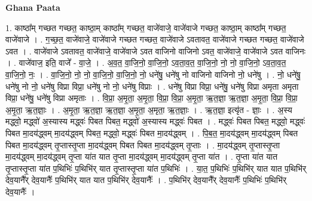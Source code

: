 \documentclass[17pt]{extarticle}
\begin{document}
\textbf{Ghana Paata } \newline

1. काष्ठा᳚म् गच्छत गच्छत॒ काष्ठा॒म् काष्ठा᳚म् गच्छत॒ वाजे॑वाजे॒ वाजे॑वाजे गच्छत॒ काष्ठा॒म् काष्ठा᳚म् गच्छत॒ वाजे॑वाजे । . ग॒च्छ॒त॒ वाजे॑वाजे॒ वाजे॑वाजे गच्छत गच्छत॒ वाजे॑वाजे ऽवतावत॒ वाजे॑वाजे गच्छत गच्छत॒ वाजे॑वाजे ऽवत । . वाजे॑वाजे ऽवतावत॒ वाजे॑वाजे॒ वाजे॑वाजे ऽवत वाजिनो वाजिनो ऽवत॒ वाजे॑वाजे॒ वाजे॑वाजे ऽवत वाजिनः । . वाजे॑वाज॒ इति॒ वाजे᳚ - वा॒जे॒ । . अ॒व॒त॒ वा॒जि॒नो॒ वा॒जि॒नो॒ ऽव॒ता॒व॒त॒ वा॒जि॒नो॒ नो॒ नो॒ वा॒जि॒नो॒ ऽव॒ता॒व॒त॒ वा॒जि॒नो॒ नः॒ । . वा॒जि॒नो॒ नो॒ नो॒ वा॒जि॒नो॒ वा॒जि॒नो॒ नो॒ धने॑षु॒ धने॑षु नो वाजिनो वाजिनो नो॒ धने॑षु । . नो॒ धने॑षु॒ धने॑षु नो नो॒ धने॑षु विप्रा विप्रा॒ धने॑षु नो नो॒ धने॑षु विप्राः । . धने॑षु विप्रा विप्रा॒ धने॑षु॒ धने॑षु विप्रा अमृता अमृता विप्रा॒ धने॑षु॒ धने॑षु विप्रा अमृताः । . वि॒प्रा॒ अ॒मृ॒ता॒ अ॒मृ॒ता॒ वि॒प्रा॒ वि॒प्रा॒ अ॒मृ॒ता॒ ऋ॒त॒ज्ञा॒ ऋ॒त॒ज्ञा॒ अ॒मृ॒ता॒ वि॒प्रा॒ वि॒प्रा॒ अ॒मृ॒ता॒ ऋ॒त॒ज्ञाः॒ । . अ॒मृ॒ता॒ ऋ॒त॒ज्ञा॒ ऋ॒त॒ज्ञा॒ अ॒मृ॒ता॒ अ॒मृता॒ ऋ॒त॒ज्ञाः॒ । . ऋ॒त॒ज्ञा॒ इत्यृ॑त - ज्ञाः॒ । . अ॒स्य मद्ध्वो॒ मद्ध्वो॑ अ॒स्यास्य मद्ध्वः॑ पिबत पिबत॒ मद्ध्वो॑ अ॒स्यास्य मद्ध्वः॑ पिबत । . मद्ध्वः॑ पिबत पिबत॒ मद्ध्वो॒ मद्ध्वः॑ पिबत मा॒दय॑द्ध्वम् मा॒दय॑द्ध्वम् पिबत॒ मद्ध्वो॒ मद्ध्वः॑ पिबत मा॒दय॑द्ध्वम् । . पि॒ब॒त॒ मा॒दय॑द्ध्वम् मा॒दय॑द्ध्वम् पिबत पिबत मा॒दय॑द्ध्वम् तृ॒प्तास्तृ॒प्ता मा॒दय॑द्ध्वम् पिबत पिबत मा॒दय॑द्ध्वम् तृ॒प्ताः । . मा॒दय॑द्ध्वम् तृ॒प्तास्तृ॒प्ता मा॒दय॑द्ध्वम् मा॒दय॑द्ध्वम् तृ॒प्ता या॑त यात तृ॒प्ता मा॒दय॑द्ध्वम् मा॒दय॑द्ध्वम् तृ॒प्ता या॑त । . तृ॒प्ता या॑त यात तृ॒प्तास्तृ॒प्ता या॑त प॒थिभिः॑ प॒थिभि॑र् यात तृ॒प्तास्तृ॒प्ता या॑त प॒थिभिः॑ । . या॒त॒ प॒थिभिः॑ प॒थिभि॑र् यात यात प॒थिभि॑र् देव॒यानै᳚र् देव॒यानैः᳚ प॒थिभि॑र् यात यात प॒थिभि॑र् देव॒यानैः᳚ । . प॒थिभि॑र् देव॒यानै᳚र् देव॒यानैः᳚ प॒थिभिः॑ प॒थिभि॑र् देव॒यानैः᳚ । \newline
\end{document}
